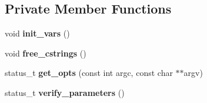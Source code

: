 \subsection*{Private Member Functions}
\begin{CompactItemize}
\item 
void \textbf{init\_\-vars} ()\label{classSimSite3D_1_1SearchParameters_0b3092dc843090100b6d8707f438ff82}

\item 
void \textbf{free\_\-cstrings} ()\label{classSimSite3D_1_1SearchParameters_c5be044fd7c950fbf1b3472d01e9c0f5}

\item 
status\_\-t \textbf{get\_\-opts} (const int argc, const char $\ast$$\ast$argv)\label{classSimSite3D_1_1SearchParameters_e7af633b8fc93087ddf5067551929741}

\item 
status\_\-t \textbf{verify\_\-parameters} ()\label{classSimSite3D_1_1SearchParameters_cc0d8f138dd11fa98a0fa52c59f1a9b2}

\end{CompactItemize}
